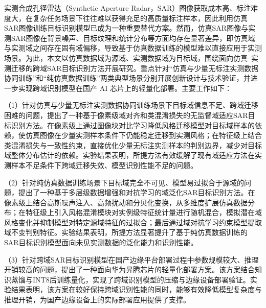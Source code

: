 \begin{cabstract}
实测合成孔径雷达（Synthetic Aperture Radar，SAR）图像获取成本高、标注难度大，在复杂任务场景下往往难以获得充足的高质量标注样本，因此利用仿真SAR图像训练目标识别模型已成为一种重要替代方案。然而，仿真SAR图像与实测SAR图像在背景噪声、目标纹理和统计分布等方面均存在显著差异，即仿真域与实测域之间存在固有域偏移，导致基于仿真数据训练的模型难以直接应用于实测场景。为此，本文以仿真数据域为源域、实测数据域为目标域，围绕面向仿真--实测迁移的跨域SAR目标识别方法开展研究。重点针对“仿真与少量无标注实测数据协同训练”和“纯仿真数据训练”两类典型场景分别开展创新设计与技术验证，并进一步实现跨域识别模型在国产 AI 芯片上的轻量化部署。主要工作如下：

（1）针对仿真与少量无标注实测数据协同训练场景下目标域信息不足、跨域迁移困难的问题，提出了一种基于像素级域对齐和类混淆损失的无监督域适应SAR目标识别方法。在像素级上通过图像块对比学习降低风格迁移模型对目标域样本的依赖，使仿真图像在少量实测样本条件下仍能稳定迁移到实测风格；在特征级上结合类混淆损失与一致性约束，直接优化少量无标注实测样本的判别边界，减少对目标域整体分布估计的依赖。实验结果表明，所提方法有效缓解了现有域适应方法在实测样本不足条件下跨域迁移失效、模型识别性能不足的问题。

（2）针对纯仿真数据训练场景下目标域完全不可见、模型易过拟合于源域的问题，提出了一种基于多层级数据增强和对抗学习的域泛化SAR目标识别方法。在像素级上结合高斯噪声注入、高频扰动和分贝化变换，从多维度扩展仿真数据分布；在特征级上引入风格混淆模块对实例级特征统计量进行随机混合，模拟潜在域风格变化并抑制模型对特定源域特征的过拟合；最后通过域对抗学习约束模型提取域不变判别特征。实验结果表明，所提方法显著提升了基于纯仿真数据训练的SAR目标识别模型面向未见实测数据的泛化能力和识别性能。

（3）针对跨域SAR目标识别模型在国产边缘平台部署过程中参数规模较大、推理开销较高的问题，提出了一种面向华为昇腾芯片的轻量化部署方案。该方案结合知识蒸馏与INT8后训练量化，实现了跨域识别模型的压缩与边缘设备部署验证。实验结果表明，该方案在较好保持跨域识别性能的同时，能够有效降低模型复杂度与推理开销，为国产边缘设备上的实际部署应用提供了支撑。

\end{cabstract}

